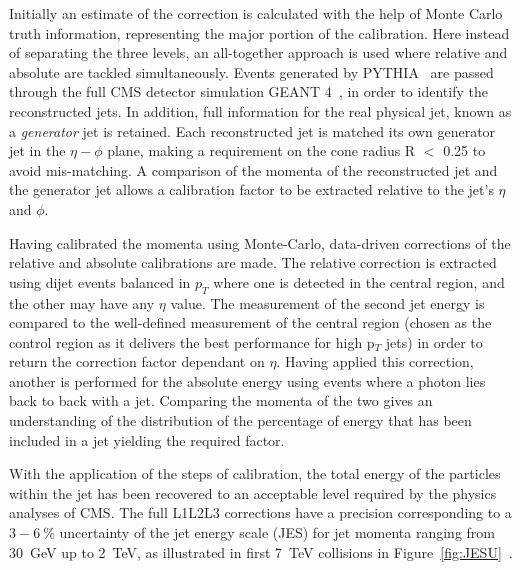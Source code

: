 Initially an estimate of the correction is calculated with the help of Monte Carlo truth information, representing the major portion of the calibration. Here instead of separating the three levels, an all-together approach is used where relative and absolute are tackled simultaneously. Events generated by \textsc{PYTHIA}~\cite{pythia} are passed through the full CMS detector simulation \textsc{GEANT 4}~\cite{GEANT4}, in order to identify the reconstructed jets. In addition, full information for the real physical jet, known as a \textit{generator} jet is retained. Each reconstructed jet is matched its own generator jet in the $\eta - \phi$ plane, making a requirement on the cone radius R $<$ 0.25 to avoid mis-matching. A comparison of the momenta of the reconstructed jet and the generator jet allows a calibration factor to be extracted relative to the jet's $\eta$ and $\phi$. 

Having calibrated the momenta using Monte-Carlo, data-driven corrections of the relative and absolute calibrations are made. The relative correction is extracted using dijet events balanced in $p_{T}$ where one is detected in the central region, and the other may have any $\eta$ value. The measurement of the second jet energy is compared to the well-defined measurement of the central region (chosen as the control region as it delivers the best performance for high p$_{T}$ jets) in order to return the correction factor dependant on $\eta$.  Having applied this correction, another is performed for the absolute energy using events where a photon lies back to back with a jet. Comparing the momenta of the two gives an understanding of the distribution of the percentage of energy that has been included in a jet yielding the required factor.

With the application of the steps of calibration, the total energy of the particles within the jet has been recovered to an acceptable level required by the physics analyses of CMS. The full L1L2L3 corrections have a precision corresponding to a $3 - 6~\%$ uncertainty of the jet energy scale (JES) for jet momenta ranging from 30~GeV up to 2~TeV, as illustrated in first 7~TeV collisions in Figure~\ref{fig:JESU}~\cite{JME-10-010}.


